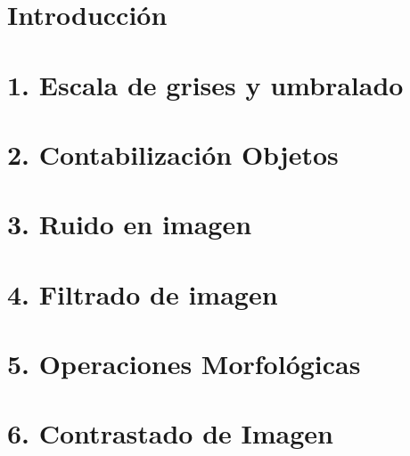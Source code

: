 \documentclass[10pt]{report}
\begin{document}
	


\hfill \break

\section*{Introducción}
	

\newpage

\section*{1. Escala de grises y umbralado}
	
	
\newpage
	
\section*{2. Contabilización Objetos}
	
	
\newpage
	
\section*{3. Ruido en imagen}
	
	
\newpage

\section*{4. Filtrado de imagen}
	
	
\newpage
	
\section*{5. Operaciones Morfológicas}
	
	
\newpage

\section*{6. Contrastado de Imagen}
	
	
\end{document}
